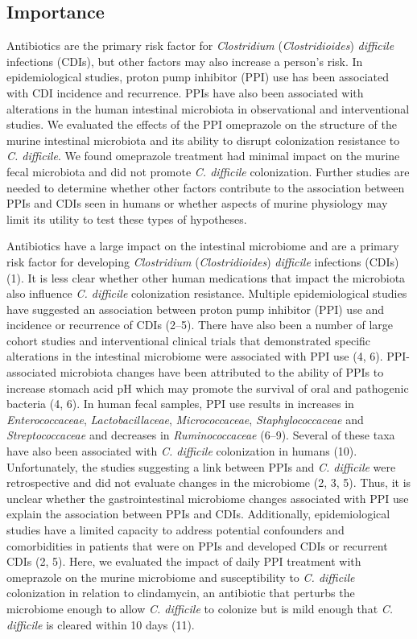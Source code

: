 \documentclass[11pt,]{article}
\begin{document}
\subsection{Importance}\label{importance}

Antibiotics are the primary risk factor for \emph{Clostridium}
(\emph{Clostridioides}) \emph{difficile} infections (CDIs), but other
factors may also increase a person's risk. In epidemiological studies,
proton pump inhibitor (PPI) use has been associated with CDI incidence
and recurrence. PPIs have also been associated with alterations in the
human intestinal microbiota in observational and interventional studies.
We evaluated the effects of the PPI omeprazole on the structure of the
murine intestinal microbiota and its ability to disrupt colonization
resistance to \emph{C. difficile}. We found omeprazole treatment had
minimal impact on the murine fecal microbiota and did not promote
\emph{C. difficile} colonization. Further studies are needed to
determine whether other factors contribute to the association between
PPIs and CDIs seen in humans or whether aspects of murine physiology may
limit its utility to test these types of hypotheses.

\newpage

Antibiotics have a large impact on the intestinal microbiome and are a
primary risk factor for developing \emph{Clostridium}
(\emph{Clostridioides}) \emph{difficile} infections (CDIs) (1). It is
less clear whether other human medications that impact the microbiota
also influence \emph{C. difficile} colonization resistance. Multiple
epidemiological studies have suggested an association between proton
pump inhibitor (PPI) use and incidence or recurrence of CDIs (2--5).
There have also been a number of large cohort studies and interventional
clinical trials that demonstrated specific alterations in the intestinal
microbiome were associated with PPI use (4, 6). PPI-associated
microbiota changes have been attributed to the ability of PPIs to
increase stomach acid pH which may promote the survival of oral and
pathogenic bacteria (4, 6). In human fecal samples, PPI use results in
increases in \emph{Enterococcaceae}, \emph{Lactobacillaceae},
\emph{Micrococcaceae}, \emph{Staphylococcaceae} and
\emph{Streptococcaceae} and decreases in \emph{Ruminococcaceae} (6--9).
Several of these taxa have also been associated with \emph{C. difficile}
colonization in humans (10).\\
Unfortunately, the studies suggesting a link between PPIs and \emph{C.
difficile} were retrospective and did not evaluate changes in the
microbiome (2, 3, 5). Thus, it is unclear whether the gastrointestinal
microbiome changes associated with PPI use explain the association
between PPIs and CDIs. Additionally, epidemiological studies have a
limited capacity to address potential confounders and comorbidities in
patients that were on PPIs and developed CDIs or recurrent CDIs (2, 5).
Here, we evaluated the impact of daily PPI treatment with omeprazole on
the murine microbiome and susceptibility to \emph{C. difficile}
colonization in relation to clindamycin, an antibiotic that perturbs the
microbiome enough to allow \emph{C. difficile} to colonize but is mild
enough that \emph{C. difficile} is cleared within 10 days (11).
\end{document}
